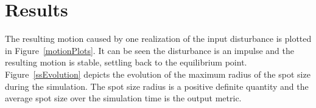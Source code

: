  \section{Results}

The resulting motion caused by one realization of the input disturbance is plotted in Figure~\ref{motionPlots}. It can be seen the disturbance is an impulse and the resulting motion is stable, settling back to the equilibrium point. Figure~\ref{ssEvolution} depicts the evolution of the maximum radius of the spot size during the simulation. The spot size radius is a positive definite quantity and the average spot size over the simulation time is the output metric.\\

\begin{figure}
	\centering
	\subfigure[]{
}
\end{figure}
